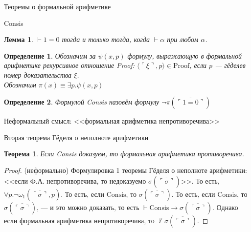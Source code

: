 \documentclass[aspectratio=169]{beamer}
\newtheorem{thm}{Теорема}[section]
\newtheorem{dfn}{Определение}[section]
\newtheorem{lmm}{Лемма}[section]
\begin{document}
\newcommand\doubleplus{+\kern-1.3ex+\kern0.8ex}
\newcommand\mdoubleplus{\ensuremath{\mathbin{+\mkern-10mu+}}}

\begin{frame}{}
\LARGE\begin{center}Теоремы о формальной арифметике\end{center}
\end{frame}

\begin{frame}{Consis}
\begin{lmm}
$\vdash 1=0$ тогда и только тогда, когда $\vdash\alpha$ при любом $\alpha$.
\end{lmm}
\begin{dfn}
Обозначим за $\psi(x,p)$ формулу, выражающую в формальной арифметике рекурсивное
отношение Proof: $\langle \ulcorner\xi\urcorner,p\rangle \in \text{Proof}$, если $p$ --- гёделев номер
доказательства $\xi$. \pause\\
Обозначим $\pi(x)\equiv\exists p.\psi(x,p)$
\end{dfn} \pause
\begin{dfn}Формулой Consis назовём формулу
$\neg \pi(\overline{\ulcorner 1=0 \urcorner})$
\end{dfn} \pause
Неформальный смысл: <<формальная арифметика непротиворечива>>
\end{frame}

\begin{frame}{Вторая теорема Гёделя о неполноте арифметики}
\begin{thm}Если Consis доказуем, то формальная арифметика противоречива.\end{thm}
\begin{proof}(неформально) \pause
Формулировка 1 теоремы Гёделя о неполноте арифметики: 
<<если Ф.А. непротиворечива, то недоказуемо $\sigma(\overline{\ulcorner\sigma\urcorner})$>>. \pause
То есть, $\forall p.\neg\omega_1(\overline{\ulcorner\sigma\urcorner},p)$. \pause То есть, 
если $\text{Consis}$, то $\sigma(\overline{\ulcorner\sigma\urcorner})$. \pause
То есть, если $\text{Consis}$, то $\sigma(\overline{\ulcorner\sigma\urcorner})$, --- и это можно доказать,
то есть $\vdash\text{Consis}\rightarrow\sigma(\overline{\ulcorner\sigma\urcorner})$. \pause Однако
если формальная арифметика непротиворечива, то $\not\vdash\sigma(\overline{\ulcorner\sigma\urcorner})$.
\end{proof}
\end{frame}
\end{document}
